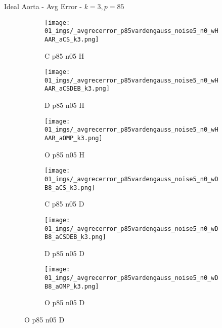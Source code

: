 \begin{frame}{Ideal Aorta - Avg Error - $k=3,p=85$}{}
\begin{figure}
\begin{subfigure}{0.13\textwidth}
\texttt{[image: 01\_imgs/\_avgrecerror\_p85vardengauss\_noise5\_n0\_wHAAR\_aCS\_k3.png]}
\caption*{\tiny C p85 n05 H}
\end{subfigure}
\begin{subfigure}{0.13\textwidth}
\texttt{[image: 01\_imgs/\_avgrecerror\_p85vardengauss\_noise5\_n0\_wHAAR\_aCSDEB\_k3.png]}
\caption*{\tiny D p85 n05 H}
\end{subfigure}
\begin{subfigure}{0.13\textwidth}
\texttt{[image: 01\_imgs/\_avgrecerror\_p85vardengauss\_noise5\_n0\_wHAAR\_aOMP\_k3.png]}
\caption*{\tiny O p85 n05 H}
\end{subfigure}
\begin{subfigure}{0.13\textwidth}
\texttt{[image: 01\_imgs/\_avgrecerror\_p85vardengauss\_noise5\_n0\_wDB8\_aCS\_k3.png]}
\caption*{\tiny C p85 n05 D}
\end{subfigure}
\begin{subfigure}{0.13\textwidth}
\texttt{[image: 01\_imgs/\_avgrecerror\_p85vardengauss\_noise5\_n0\_wDB8\_aCSDEB\_k3.png]}
\caption*{\tiny D p85 n05 D}
\end{subfigure}
\begin{subfigure}{0.13\textwidth}
\texttt{[image: 01\_imgs/\_avgrecerror\_p85vardengauss\_noise5\_n0\_wDB8\_aOMP\_k3.png]}
\caption*{\tiny O p85 n05 D}
\end{subfigure}

\vspace{5pt}


\end{figure}
\end{frame}
